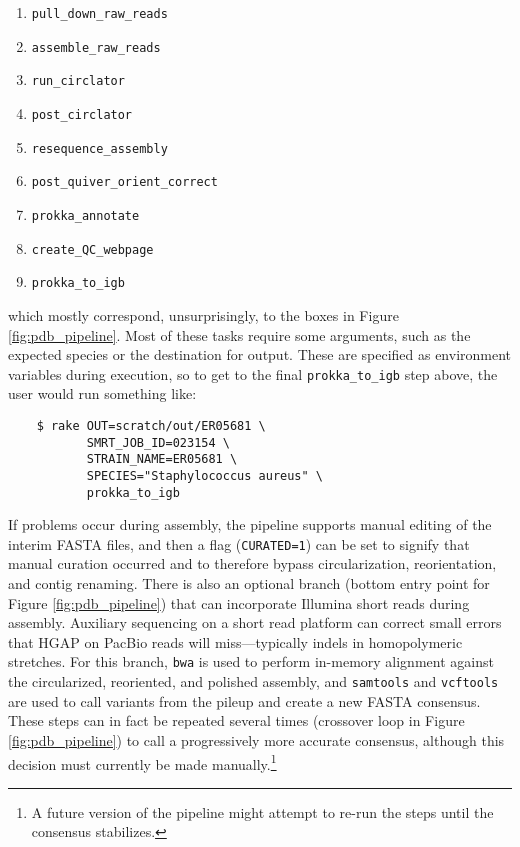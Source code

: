 \begin{enumerate}[label=\arabic*.,noitemsep,labelindent=2em,leftmargin=!]
\item \verb|pull_down_raw_reads|
\item \verb|assemble_raw_reads|
\item \verb|run_circlator|
\item \verb|post_circlator|
\item \verb|resequence_assembly|
\item \verb|post_quiver_orient_correct|
\item \verb|prokka_annotate|
\item \verb|create_QC_webpage|
\item \verb|prokka_to_igb|
\end{enumerate}

which mostly correspond, unsurprisingly, to the boxes in Figure \ref{fig:pdb_pipeline}. Most of these tasks require some arguments, such as the expected species or the destination for output. These are specified as environment variables during execution, so to get to the final \verb|prokka_to_igb| step above, the user would run something like:

\begin{verbatim}
    $ rake OUT=scratch/out/ER05681 \
           SMRT_JOB_ID=023154 \
           STRAIN_NAME=ER05681 \
           SPECIES="Staphylococcus aureus" \
           prokka_to_igb
\end{verbatim}

If problems occur during assembly, the pipeline supports manual editing of the interim FASTA files, and then a flag (\texttt{CURATED=1}) can be set to signify that manual curation occurred and to therefore bypass circularization, reorientation, and contig renaming. There is also an optional branch (bottom entry point for Figure \ref{fig:pdb_pipeline}) that can incorporate Illumina short reads during assembly. Auxiliary sequencing on a short read platform can correct small errors that HGAP on PacBio reads will miss—typically indels in homopolymeric stretches. For this branch, \texttt{bwa}\autocite{Li2010b} is used to perform in-memory alignment against the circularized, reoriented, and polished assembly, and \texttt{samtools}\autocite{Li2009b} and \texttt{vcftools}\autocite{Danecek2011a} are used to call variants from the pileup and create a new FASTA consensus. These steps can in fact be repeated several times (crossover loop in Figure \ref{fig:pdb_pipeline}) to call a progressively more accurate consensus, although this decision must currently be made manually.\footnote{A future version of the pipeline might attempt to re-run the steps until the consensus stabilizes.}

